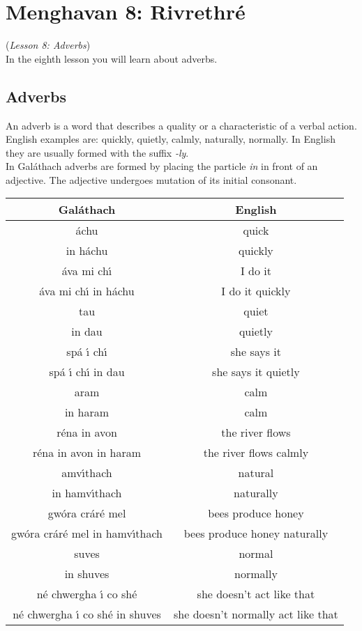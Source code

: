\section{Menghavan 8: Rivrethr\'{e}}
(\textit{Lesson 8: Adverbs})\\

In the eighth lesson you will learn about adverbs.

\subsection{Adverbs}

An adverb is a word that describes a quality or a characteristic of a verbal action.\\
English examples are: quickly, quietly, calmly, naturally, normally. In English they are usually formed with the suffix \textit{-ly}.\\
In Gal\'{a}thach adverbs are formed by placing the particle \textit{in} in front of an adjective. The adjective undergoes mutation of its initial consonant.
\begin{table}[H]
\centering
\begin{tabular}{cc}
  \toprule
  \textbf{Gal\'{a}thach} & \textbf{English}\\
  \midrule
  \'{a}chu & quick\\
  in h\'{a}chu & quickly\\
  \'{a}va mi ch\'{\i} & I do it\\
  \'{a}va mi ch\'{\i} in h\'{a}chu & I do it quickly\\
  \cmidrule(lr){1-1}\cmidrule(lr){2-2}
  tau & quiet\\
  in dau & quietly\\
  sp\'{a} \'{\i} ch\'{\i} & she says it\\
  sp\'{a} \'{\i} ch\'{\i} in dau & she says it quietly\\
  \cmidrule(lr){1-1}\cmidrule(lr){2-2}
  aram & calm\\
  in haram & calm\\
  r\'{e}na in avon & the river flows\\
  r\'{e}na in avon in haram & the river flows calmly\\
  \cmidrule(lr){1-1}\cmidrule(lr){2-2}
  amv\'{\i}thach & natural\\
  in hamv\'{\i}thach & naturally\\
  gw\'{o}ra cr\'{a}r\'{e} mel & bees produce honey\\
  gw\'{o}ra cr\'{a}r\'{e} mel in hamv\'{\i}thach & bees produce honey naturally\\
  \cmidrule(lr){1-1}\cmidrule(lr){2-2}
  suves & normal\\
  in shuves & normally\\
  n\'{e} chwergha \'{\i} co sh\'{e} & she doesn't act like that\\
  n\'{e} chwergha \'{\i} co sh\'{e} in shuves & she doesn't normally act like that\\
  \bottomrule
\end{tabular}
\label{examples_adverb}
\end{table}

